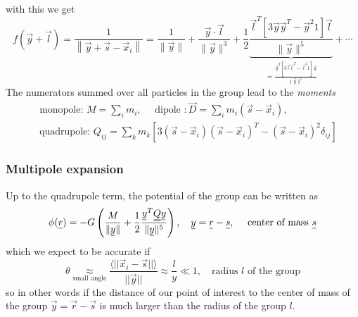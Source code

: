 with this we get
\begin{equation}
    f(\vec{y}+\vec{l})=\frac{1}{\left\|\vec{y}+\vec{s}-\vec{x}_i\right\|}=\frac{1}{\|\vec{y}\|}+\frac{\vec{y} \cdot \vec{l}}{\|\vec{y}\|^3}+\frac{1}{2} \underbrace{\frac{\vec{l}^T\left[3 \vec{y} \vec{y}^T-\vec{y}^2 1\right] \vec{l}}{\|\vec{y}\|^5}}_{=\frac{\vec{y}^T\left[3 \vec{l} \vec{l}^T-\vec{l}^2 1\right] \vec{y}}{\|\vec{y}\|^5}}+\cdots
\end{equation}
The numerators summed over all particles in the group lead to the \textit{moments}
\begin{equation}
    \begin{aligned}
    & \text { monopole: } M=\sum_i m_i, \quad \text { dipole }: \vec{D}=\sum_i m_i\left(\vec{s}-\vec{x}_i\right), \\
    & \text { quadrupole: } Q_{i j}=\sum_k m_k\left[3\left(\vec{s}-\vec{x}_i\right)\left(\vec{s}-\vec{x}_i\right)^T-\left(\vec{s}-\vec{x}_i\right)^2 \delta_{i j}\right]
    \end{aligned}
\end{equation}


\subsubsection{Multipole expansion}
Up to the quadrupole term, the potential of the group can be written as
\begin{equation}
    \phi(\vec{r})=-G\left(\frac{M}{\|\vec{y}\|}+\frac{1}{2} \frac{\vec{y}^{T} \mat{Q} \vec{y}}{\|\vec{y}\|^5}\right), \quad \vec{y}=\vec{r}-\vec{s}, \quad \text { center of mass } \vec{s}
\end{equation}
which we expect to be accurate if
\begin{equation}
    \theta \underset{\text{small angle}}{\approx} \frac{\langle ||\vec{x}_i - \vec{s}|| \rangle}{||\vec{y}||} \approx \frac{l}{y} \ll 1, \quad \text{radius } l \text{ of the group}
\end{equation}
so in other words if the distance
of our point of interest to the center of mass
of the group $\vec{y} = \vec{r} - \vec{s}$ is much 
larger than the radius of the group $l$.

